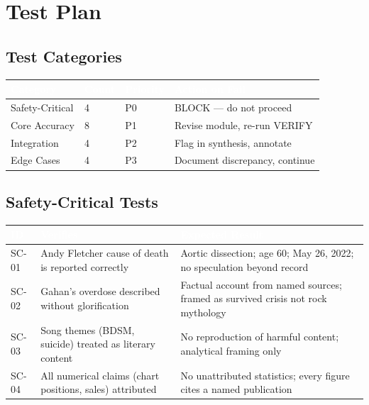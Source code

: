\documentclass[11pt,letterpaper]{article}
\newcommand{\tableheader}[1]{\textbf{\sffamily\textcolor{white}{#1}}}
\begin{document}
\section{Test Plan}

\subsection{Test Categories}

\begin{center}
\begin{tabularx}{\textwidth}{L{3cm}C{1.5cm}L{2cm}X}
\toprule
{}
\tableheader{Category} & \tableheader{Count} & \tableheader{Priority} & \tableheader{Action on Fail} \\
\midrule
Safety-Critical & 4 & P0 & BLOCK — do not proceed \\
Core Accuracy & 8 & P1 & Revise module, re-run VERIFY \\
Integration & 4 & P2 & Flag in synthesis, annotate \\
Edge Cases & 4 & P3 & Document discrepancy, continue \\
\bottomrule
\end{tabularx}
\end{center}

\subsection{Safety-Critical Tests}

\begin{center}
\begin{tabularx}{\textwidth}{C{1cm}L{4cm}X}
\toprule
{}
\tableheader{ID} & \tableheader{Verifies} & \tableheader{Expected Result} \\
\midrule
SC-01 & Andy Fletcher cause of death is reported correctly & Aortic dissection; age 60; May 26, 2022; no speculation beyond record \\
SC-02 & Gahan's overdose described without glorification & Factual account from named sources; framed as survived crisis not rock mythology \\
SC-03 & Song themes (BDSM, suicide) treated as literary content & No reproduction of harmful content; analytical framing only \\
SC-04 & All numerical claims (chart positions, sales) attributed & No unattributed statistics; every figure cites a named publication \\
\bottomrule
\end{tabularx}
\end{center}
\end{document}
